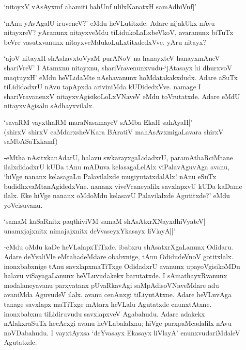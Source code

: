 \begin{shloka}
`nitoyxV vAsAyxmf ahamiti bahUnf ulilxKanatxH samAdhiVnf|'
\end{shloka}

`nAnu yAvAgalU iruveneV?' eMdu heVLutitxde. Adare nijakUkx nAvu nitayxreV? yAranunx nitayxveMdu tiLidukoLaLxbeVkoV, avaranunx biTuTx beVre vasutxvanunx nitayxveMdukoLuLxtitxdedxVve. yAru nitayx?

`ajoV nitayxH shAshavxtoV\s yaM purANoV na hanayxteV hanayxmAneV shariVreV' I Atamxnu nitayxnu, shariVravenunxvudu-`jAtasayx hi dhurxvoV maqtuyxH' eMdu heVLidaMte nAshavanunx hoMdatakakxdudx. Adare aSuTx tiLididadxrU nAvu tapApxda ariviniMda kUDidedxVve. namage I shariVravanenxV nitayxvAgisikoLoLxVNaveV eMdu toVrutatxde. Adare eMdU nitayxvAgisalu sAdhayxvilalx.

\begin{shloka}
`savaRM vayxthaRM maraNasamayeV sAMba EkaH sahAyaH|'\\
(shirxV shirxV caMdarxsheVKara BAratiV mahAsAvxmigaLavara shirxV\\
saMbASaTxkamf)
\end{shloka}

-eMtha nAsitxkanAdarU, halavu swkarayxgaLidadxrU, paramAthaRciMtane ilalxdidadxrU kUDa tAnu mADuva kelasagaLelAlx viPalavAguvAga avanu, `hiVge nananx kelasagaLu Palavilalxde mugiyutatxdalAlx! nAnu eSuTx budidhxvaMtanAgidedxVne. nananx viveVcaneyalilx savxlapxvU kUDa kaDame ilalx. Eke hiVge nananx oMdoMdu kelasavU Palavilalxde Agutitxde?' eMdu yoVcisuvanu.

\begin{shloka}
`samaM kaSaRnitx paqthiviVM samaM shAsAtxrXNayxdhiVyateV|\\
unamxjajxnitx nimajajxnitx deVvaseyxYkasayx liVlayA||'
\end{shloka}

-eMdu oMdu kaDe heVLalapxTiTxde. ibabxru shAsatxrXgaLanunx Odidaru. Adare deYvaliVle eMtahadeMdare obabxnige, tAnu OdidudeVnoV gotitxlalx. inonxbabxnige tAnu savxlapxmaTiTxge OdidadxrU avanunx upayoVgisikoMDu halavu viSayagaLanunx heVLuvudakekx barutatxde. I sAmathayxRvanunx modalaneyavanu parxyatanx pUvaRkavAgi saMpAdisoVNaveMdare adu avaniMda AguvudeV ilalx. avanu cenAnxgi tiLiyutAtxne. Adare heVLuvAga tanage savxlapx maTiTxge mAtarx heVLalu Agutatxde enunxtAtxne. inonxbabxnu tiLidiruvudu savxlapxveV Agabahudu. Adare adakekx nAlakxraSuTx hecAcxgi avanu heVLabalalxnu; hiVge parxpaMcadalilx nAvu noVDabahudu. I vayxtAyxsa `deYvasayx Ekasayx liVlayA' enunxvudariMdaleV Agutatxde.

